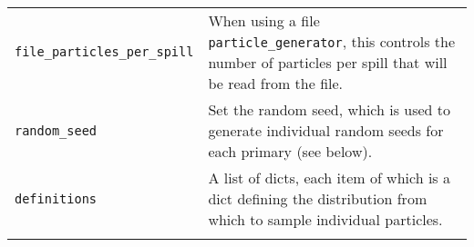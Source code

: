 \begin{table*}
\begin{center}
\begin{tabularx}{\textwidth}{lX}
\verb|file_particles_per_spill| & When using a file \verb|particle_generator|, this controls the number of particles per spill that will be read from the file.\\
\verb|random_seed| & Set the random seed, which is used to generate individual random seeds for each primary (see below). \\
\verb|definitions| & A list of dicts, each item of which is a dict defining the distribution from which to sample individual particles. \\
\begin{makeimage} %
\end{makeimage} 
\end{tabularx}
\end{center}
\end{table*}


